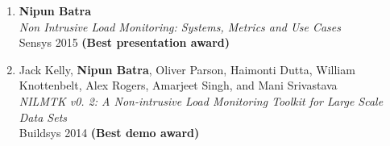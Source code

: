 \documentclass[letter,10pt]{article}
\begin{document}
\begin{itemize}
\begin{enumerate}
        \item {\textbf{Nipun Batra}} \\
        \textit{Non Intrusive Load Monitoring: Systems, Metrics and Use Cases} \\
{Sensys 2015 \textbf{(Best presentation award)}}

\item {Jack Kelly, \textbf{Nipun Batra}, Oliver Parson, Haimonti Dutta, William Knottenbelt, Alex Rogers, Amarjeet Singh,
	and Mani Srivastava}\\
\textit{NILMTK v0. 2: A Non-intrusive Load Monitoring Toolkit for Large Scale Data Sets}\\ 
{Buildsys 2014 \textbf{(Best demo award)}}


\end{enumerate}
\end{itemize}
\end{document}

